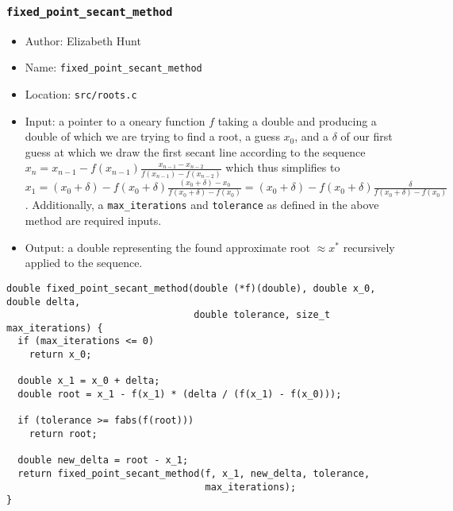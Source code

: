 \documentclass[11pt]{article}
\begin{document}
\subsubsection{\texttt{fixed\_point\_secant\_method}}
\label{sec:org63bcbe2}
\begin{itemize}
\item Author: Elizabeth Hunt
\item Name: \texttt{fixed\_point\_secant\_method}
\item Location: \texttt{src/roots.c}
\item Input: a pointer to a oneary function \(f\) taking a double and producing a double of which we are
trying to find a root, a guess \(x_0\), and a \(\delta\) of our first guess at which we draw the first
secant line according to the sequence \(x_n = x_{n-1} - f(x_{n-1}) \frac{x_{n-1} - x_{n-2}}{f(x_{n-1}) - f(x_{n-2})}\) which
thus simplifies to \(x_1 = (x_0 + \delta) - f(x_0 + \delta) \frac{(x_0 + \delta) - x_0}{f(x_0 + \delta) - f(x_0)} = (x_0 + \delta) - f(x_0 + \delta) \frac{\delta}{f(x_0 + \delta) - f(x_0)}\).
Additionally, a \texttt{max\_iterations} and \texttt{tolerance} as defined in the above method are required
inputs.
\item Output: a double representing the found approximate root \(\approx x^*\) recursively applied to the sequence.
\end{itemize}
\begin{verbatim}
double fixed_point_secant_method(double (*f)(double), double x_0, double delta,
                                 double tolerance, size_t max_iterations) {
  if (max_iterations <= 0)
    return x_0;

  double x_1 = x_0 + delta;
  double root = x_1 - f(x_1) * (delta / (f(x_1) - f(x_0)));

  if (tolerance >= fabs(f(root)))
    return root;

  double new_delta = root - x_1;
  return fixed_point_secant_method(f, x_1, new_delta, tolerance,
                                   max_iterations);
}
\end{verbatim}
\end{document}
